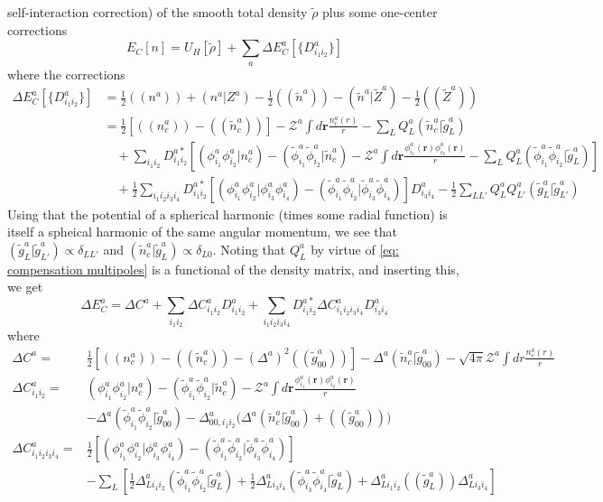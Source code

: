 \documentclass[a4paper]{article}
\newcommand{\s}[1]{\tilde{#1}}
\newcommand{\br}{\mathbf{r}}
\newcommand{\Z}{\mathcal{Z}}
\begin{document}
self-interaction correction) of the smooth total density $\s{\rho}$
plus some one-center corrections
%
\begin{equation}
   E_C[n] = U_H[\s{\rho}] + \sum_a \Delta E_C^a[\{D^a_{i_1i_2}\}]
\end{equation}
%
where the corrections
%
\begin{align*}
  \Delta E_C^a[\{D^a_{i_1i_2}\}] &= \tfrac{1}{2} ((n^a)) + (n^a|Z^a) - \tfrac{1}{2} ((\s{n}^a)) - (\s{n}^a| \s{Z}^a) - \tfrac{1}{2} ((\s{Z}^a))\\
  &= \tfrac{1}{2} \left[((n_c^a)) - ((\s{n}_c^a))\right] - \Z^a\int d\br \frac{n_c^a(r)}{r} - \sum_L Q_L^a(\s{n}_c^a|\s{g}_L^a)\\
  &\quad+ \sum_{i_1i_2} D^{a*}_{i_1i_2}\left[ (\phi_{i_1}^a\phi_{i_2}^{a}|n_c^a) - (\s{\phi}_{i_1}^a\s{\phi}_{i_2}^{a}|\s{n}_c^a) - \Z^a\int d\br \frac{\phi_{i_1}^{a}(\br)\phi_{i_2}^{a}(\br)}{r} -\sum_L Q_L^a(\s{\phi}_{i_1}^a\s{\phi}_{i_2}^{a}|\s{g}_L^a)\right] \\
  &\quad+ \frac{1}{2}\sum_{i_1i_2i_3i_4} D^{a*}_{i_1i_2}\left[(\phi_{i_1}^a\phi_{i_2}^{a}|\phi_{i_3}^a\phi_{i_4}^{a}) - (\s{\phi}_{i_1}^a\s{\phi}_{i_2}^{a}|\s{\phi}_{i_3}^a\s{\phi}_{i_4}^{a}) \right]D^{a}_{i_3i_4} - \frac{1}{2}\sum_{LL'}Q_L^aQ_{L'}^a (\s{g}_L^a|\s{g}_{L'}^a)
\end{align*}
%
Using that the potential of a spherical harmonic (times some radial
function) is itself a spheical harmonic of the same angular momentum,
we see that $(\s{g}_L^a|\s{g}_{L'}^a) \propto \delta_{LL'}$ and
$(\s{n}_c^a|\s{g}_L^a) \propto \delta_{L0}$. Noting that $Q_L^a$ by
virtue of \ref{eq: compensation multipoles} is a functional of the
density matrix, and inserting this, we get
%
\begin{equation}
  \Delta E_C^a = \Delta C^a + \sum_{i_1i_2} \Delta C^a_{i_1i_2} D^a_{i_1i_2} + \sum_{i_1i_2i_3i_4} D^{a*}_{i_1i_2} \Delta C^a_{i_1i_2i_3i_4} D^a_{i_3i_4}
\end{equation}
%
where
\begin{align}
  \Delta C^a =& \tfrac{1}{2} \left[((n_c^a)) - ((\s{n}_c^a)) - (\Delta^a)^2 ((\s{g}^a_{00}))\right] - \Delta^a (\s{n}_c^a|\s{g}_{00}^a) - \sqrt{4\pi}\Z^a \int dr \frac{n_c^a(r)}{r}\label{eq:coulom tensor 0}\\
  \Delta C^a_{i_1i_2} =& (\phi_{i_1}^a\phi_{i_2}^{a}|n_c^a) - (\s{\phi}_{i_1}^a\s{\phi}_{i_2}^{a}|\s{n}_c^a) - \Z^a\int d\br \frac{\phi_{i_1}^{a}(\br)\phi_{i_2}^{a}(\br)}{r} \nonumber \\
  &- \Delta^a (\s{\phi}_{i_1}^a\s{\phi}_{i_2}^{a}|\s{g}_{00}^a) - \Delta^a_{00,i_1i_2}\Big( \Delta^a (\s{n}_c^a|\s{g}_{00}^a) + ((\s{g}^a_{00})) \Big)\label{eq:coulom tensor 1}\\
  \Delta C^a_{i_1i_2i_3i_4} =& \tfrac{1}{2} \left[(\phi_{i_1}^a\phi_{i_2}^{a} | \phi_{i_3}^a\phi_{i_4}^{a}) - (\s{\phi}_{i_1}^a\s{\phi}_{i_2}^{a}|\s{\phi}_{i_3}^a\s{\phi}_{i_4}^{a}) \right] \nonumber\\
  & -\sum_L \left[ \tfrac{1}{2}\Delta^a_{Li_1i_2}(\s{\phi}_{i_1}^a\s{\phi}_{i_2}^{a}|\s{g}_L^a) + \tfrac{1}{2}\Delta^a_{Li_3i_4}(\s{\phi}_{i_3}^a\s{\phi}_{i_4}^{a}|\s{g}_L^a) + \Delta^a_{Li_1i_2}((\s{g}^a_L))\Delta^a_{Li_3i_4} \right]\label{eq:coulom tensor 2}
\end{align}
\end{document}
